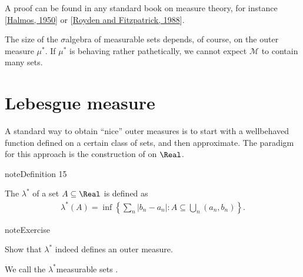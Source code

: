 \documentclass[letterpaper,10pt,english]{jupyterBook}
\begin{document}
\sphinxAtStartPar
A proof can be found in any standard book on measure theory, for instance {[}\hyperlink{cite.bibliography:id7}{Halmos, 1950}{]} or {[}\hyperlink{cite.bibliography:id14}{Royden and Fitzpatrick, 1988}{]}.

\sphinxAtStartPar
The size of the \(\sigma\)\sphinxhyphen{}algebra of measurable sets depends, of course, on the outer measure \(\mu^*\). If \(\mu^*\) is behaving rather pathetically, we cannot expect \(\mathcal{M}\) to contain many sets.


\section{Lebesgue measure}
\label{\detokenize{measure:lebesgue-measure}}
\sphinxAtStartPar
A standard way to obtain “nice” outer measures is to start with a well\sphinxhyphen{}behaved function defined on a certain class of sets, and then approximate. The paradigm for this approach is the construction of  on \(\Real\).
\label{measure:def-Lebesgue}
\begin{sphinxadmonition}{note}{Definition 15}



\sphinxAtStartPar
The  \(\lambda^*\) of a set \(A \subseteq \Real\) is defined as
\begin{equation*}
\begin{split}
\lambda^*(A) = \inf \left \{ \sum_n |b_n - a_n| \colon A \subseteq \bigcup_n (a_n,b_n) \right \}. 
\end{split}
\end{equation*}\end{sphinxadmonition}

\begin{sphinxadmonition}{note}{Exercise}

\sphinxAtStartPar
Show that \(\lambda^*\) indeed defines an outer measure.
\end{sphinxadmonition}

\sphinxAtStartPar
We call the \(\lambda^*\)\sphinxhyphen{}measurable sets .
\end{document}
